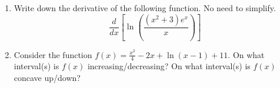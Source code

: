 \documentclass[11pt]{article}
\begin{document}
\begin{enumerate}

\newpage


\item[\textbf{D2/D3.}]
Write down the derivative of the following function.
No need to simplify.
\[\displaystyle \frac{d}{dx}\left[ \ln\left(\frac{(x^2+3)e^{x}}{x} \right)\right]\]
\vfill



\newpage


\item[\textbf{A1.}]
Consider the function $f(x)=\frac{x^2}{4} - 2x + \ln(x-1)+11$.
On what interval(s) is $f(x)$ increasing/decreasing?
On what interval(s) is $f(x)$ concave up/down?



\end{enumerate}
\end{document}
